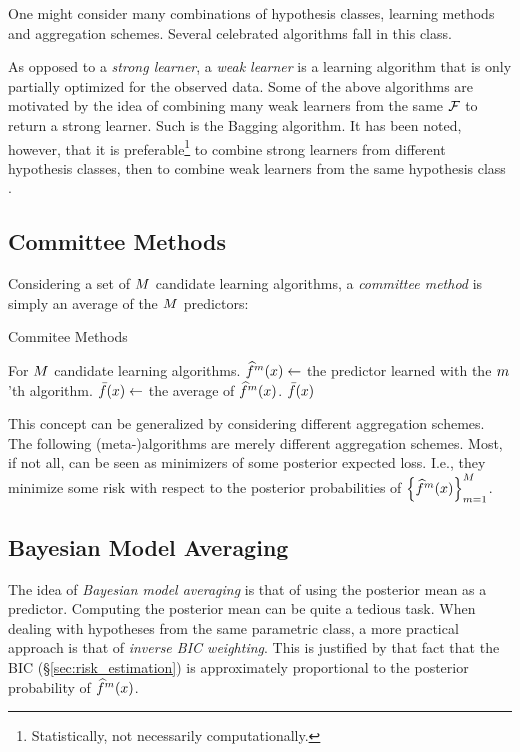 One might consider many combinations of hypothesis classes, learning methods and aggregation schemes.
Several celebrated algorithms fall in this class. 



\begin{remark}
As opposed to a \emph{strong learner}, a \emph{weak learner} is a learning algorithm that is only partially optimized for the observed data. 
Some of the above algorithms are motivated by the idea of combining many weak learners from the same $\mathcal{F}$ to return a strong learner. 
Such is the Bagging algorithm. 
It has been noted, however, that it is preferable\footnote{Statistically, not necessarily computationally.}  to combine strong learners from different hypothesis classes, then to combine weak learners from the same hypothesis class \cite{gashler_decision_2008}.
\end{remark}




\subsection{Committee Methods}
Considering a set of $M$ candidate learning algorithms, a \emph{committee method} is simply an average of the $M$ predictors:

\begin{algorithm}[H]
\caption{Commitee Methods}
\label{algo:committee}
\begin{algorithmic}
\State For $M$ candidate learning algorithms.
	\State $\widehat{f}^m(x) \gets$ the predictor learned with the $m$'th algorithm.
\EndFor
\State $\bar{f}(x) \gets$ the average of $\widehat{f}^m(x)$. 
\State \Return $\bar{f}(x)$
\end{algorithmic}
\end{algorithm}

This concept can be generalized by considering different aggregation schemes. The following (meta-)algorithms are merely different aggregation schemes. Most, if not all, can be seen as minimizers of some posterior expected loss. I.e., they minimize some risk with respect to the posterior probabilities of $\left\{ \widehat{f}^m(x)  \right\}_{m=1}^M $.


\subsection{Bayesian Model Averaging}
The idea of \emph{Bayesian model averaging} is that of using the posterior mean as a predictor. 
Computing the posterior mean can be quite a tedious task. 
When dealing with hypotheses from the same parametric class, a more practical approach is that of \emph{inverse BIC weighting}. 
This is justified by that fact that the BIC (\S\ref{sec:risk_estimation}) is approximately proportional to the posterior probability of $\widehat{f}^m(x)$.


